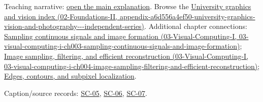 Teaching narrative: \hyperref[04-visual-computing-ii-ch031-convolutional-models-preserve-image-neighborhoods]{open the main explanation}. Browse the \href{../02-Foundations-II/main.pdf\#nameddest=appendix-a6d556a4ef50-university-graphics-vision-and-photography---independent-series}{University graphics and vision index (02-Foundations-II, appendix-a6d556a4ef50-university-graphics-vision-and-photography-\/-\/-independent-series)}. Additional chapter connections: \href{../03-Visual-Computing-I/main.pdf\#nameddest=03-visual-computing-i-ch003-sampling-continuous-signals-and-image-formation}{Sampling continuous signals and image formation (03-Visual-Computing-I, 03-visual-computing-i-ch003-sampling-continuous-signals-and-image-formation)}; \href{../03-Visual-Computing-I/main.pdf\#nameddest=03-visual-computing-i-ch004-image-sampling-filtering-and-efficient-reconstruction}{Image sampling, filtering, and efficient reconstruction (03-Visual-Computing-I, 03-visual-computing-i-ch004-image-sampling-filtering-and-efficient-reconstruction)}; \hyperref[04-visual-computing-ii-ch030-edges-contours-and-subpixel-localization]{Edges, contours, and subpixel localization}.

Caption/source records: \hyperref[04-visual-computing-ii-ch036-sc-05---stanford-cs231n-spring-2025-lecture-5-image-classification-with-cnns]{SC-05}, \hyperref[04-visual-computing-ii-ch036-sc-06---stanford-cs231n-deep-learning-for-computer-vision-spring-2025-lecture-6-cnn-architectures]{SC-06}, \hyperref[04-visual-computing-ii-ch036-sc-07---stanford-cs231n-spring-2025-lecture-7-recurrent-neural-networks]{SC-07}.
